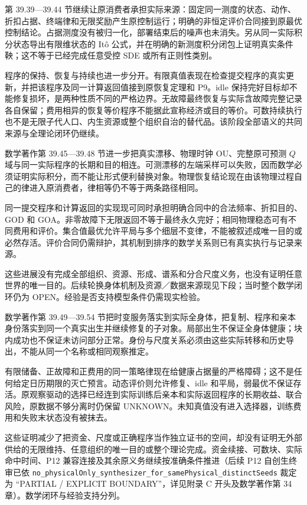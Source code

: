 \documentclass[
  11pt,
  oneside]{book}
\begin{document}
第 39.39---39.44 节继续让原消费者承担实际来源：固定同一测度的状态、动作、折扣占据、终端律和无限奖励产生原控制运行；明确的非恒定评价合同接到原最优控制结论。占据测度没有被归一化，部署结束后的噪声也未消失。另从同一实际积分状态导出有限维状态的 Itô 公式，并在明确的新测度积分闭包上证明真实条件鞅；这不等于已经完成任意受控 SDE 或所有正则性类别。

程序的保持、恢复与持续也进一步分开。有限真值表现在检查提交程序的真实更新，并把该程序及同一计算返回值接到原恢复定理和 P9。idle 保持完好目标却不能修复损坏，是两种性质不同的严格边界。无故障最终恢复与实际含故障完整记录各自保留；费用相异的恢复等价程序不能据此宣称经济或目的等价。可数持续执行也不是无限子代人口、内生资源或整个组织自治的替代品。该阶段全部语义的共同来源与全理论闭环仍继续。

数学著作第 39.45---39.48 节进一步把真实漂移、物理时钟 OU、完整原可预测 \(Q\) 域与同一实际程序的长期和目的相连。可测漂移的左端采样可以失败，因而数学必须证明实际积分，而不能让形式便利替换对象。物理恢复结论现在由该物理过程自己的律进入原消费者，律相等仍不等于两条路径相同。

同一提交程序和计算返回的实现现可同时承担明确合同中的合法频率、折扣目的、GOD 和 GOA。非零故障下无限返回不等于最终永久完好；相同物理稳态可有不同费用和评价。集合值最优允许平局与多个细层不变律，不能被叙述成唯一目的或必然存活。评价合同仍需辩护，其机制到排序的数学关系则已有真实执行与记录来源。

这些进展没有完成全部组织、资源、形成、谱系和分合尺度义务，也没有证明任意世界的唯一目的。后续轮换身体机制及资源／数据来源现见下段；当时整个数学闭环仍为 OPEN。经验是否支持模型条件仍需现实检验。

数学著作第 39.49---39.54 节把时变服务落实到实际全身体，把复制、程序和亲本身份落实到同一个真实出生并继续修复的子对象。局部出生不保证全身体健康；块内成功也不保证未访问部分正常。身份与尺度关系必须由这些实际转移和历史导出，不能从同一个名称或相同观察推定。

有限储备、正故障和正费用的同一策略律现在给健康占据量的严格障碍；这不是任何给定日历期限的灭亡预言。动态评价则允许修复、idle 和平局，弱最优不保证存活。原观察驱动的选择已经连到实际训练后亲本和实际返回程序的长期收益、联合风险，原数据不够分离时仍保留 UNKNOWN。未知真值没有进入选择器，训练费用和失败末状态没有被抹去。

这些证明减少了把资金、尺度或正确程序当作独立证书的空间，却没有证明无外部供给的无限维持、任意组织的唯一目的或整个理论完成。资金续接、可数块、实际命中时间、P12 兼容连接及其余原义务继续按准确条件推进（后续 P12 自创生终审已依 \nolinkurl{no_physicalOnly_synthesizer_for_samePhysical_distinctSeeds} 裁定为 ``PARTIAL / EXPLICIT BOUNDARY''，详见附录 C 开头及数学著作第 34 章）。数学闭环与经验支持分列。
\end{document}
